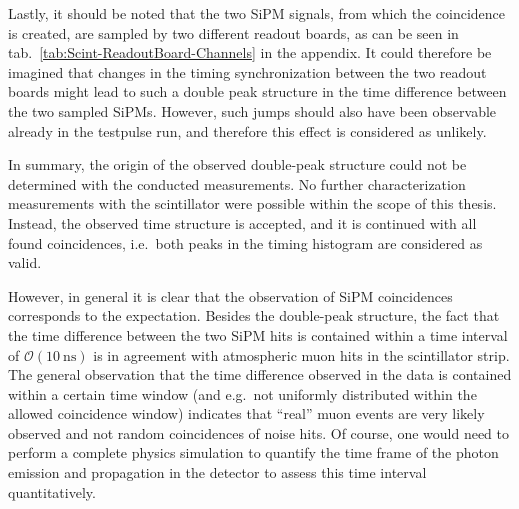 \par Lastly, it should be noted that the two \ac{SiPM} signals, from which the coincidence is created, are sampled by two different readout boards, as can be seen in tab.\ \ref{tab:Scint-ReadoutBoard-Channels} in the appendix. It could therefore be imagined that changes in the timing synchronization between the two readout boards might lead to such a double peak structure in the time difference between the two sampled \acp{SiPM}. However, such jumps should also have been observable already in the testpulse run, and therefore this effect is considered as unlikely.
\par In summary, the origin of the observed double-peak structure could not be determined with the conducted measurements. No further characterization measurements with the scintillator were possible within the scope of this thesis. Instead, the observed time structure is accepted, and it is continued with all found coincidences, i.e.\ both peaks in the timing histogram are considered as valid.
\par However, in general it is clear that the observation of \ac{SiPM} coincidences corresponds to the expectation. Besides the double-peak structure, the fact that the time difference between the two \ac{SiPM} hits is contained within a time interval of $\mathcal{O}(\SI{10}{\nano\second})$ is in agreement with atmospheric muon hits in the scintillator strip. The general observation that the time difference observed in the data is contained within a certain time window (and e.g.\ not uniformly distributed within the allowed coincidence window) indicates that \enquote{real} muon events are very likely observed and not random coincidences of noise hits. Of course, one would need to perform a complete physics simulation to quantify the time frame of the photon emission and propagation in the detector to assess this time interval quantitatively.

